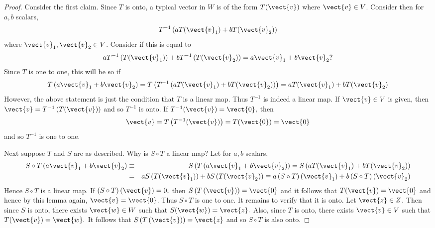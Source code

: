 \begin{proof}
Consider the first claim. Since $T$ is onto, a typical
vector in $W$ is of the form $T(\vect{v})$ where $\vect{v} \in V$. Consider then for $a,b$
scalars, 
\begin{equation*}
T^{-1}\left( aT(\vect{v}_{1})+bT(\vect{v}_{2})\right)
\end{equation*}
where $\vect{v}_{1}, \vect{v}_2 \in V$. Consider if this is equal to 
\begin{equation*}
aT^{-1}\left( T(\vect{v}_{1})\right) +bT^{-1}\left( T(\vect{v}_{2})\right) =a\vect{v}_{1}+b\vect{v}_{2}?
\end{equation*}
Since $T$ is one to one, this will be so if 
\begin{equation*}
T\left( a\vect{v}_{1}+b\vect{v}_{2}\right) =T\left( T^{-1}\left( aT(\vect{v}_{1})+bT(\vect{v}_{2})\right)
\right) =aT(\vect{v}_{1})+bT(\vect{v}_{2})
\end{equation*}
However, the above statement is just the condition that $T$ is a linear map.
Thus $T^{-1}$ is indeed a linear map. If $\vect{v} \in V$ is given, then $
\vect{v}=T^{-1}\left( T(\vect{v})\right) $ and so $T^{-1}$ is onto. If $T^{-1}(\vect{v})=\vect{0},$ then 
\begin{equation*}
\vect{v}=T\left( T^{-1}(\vect{v})\right) =T(\vect{0})=\vect{0}
\end{equation*}
and so  $T^{-1}$ is one to one.

Next suppose $T$ and $S$ are as described. Why is $S\circ T$ a linear map?
Let for $a,b$ scalars,
\begin{eqnarray*}
S\circ T\left( a\vect{v}_{1}+b\vect{v}_{2}\right) &\equiv &S\left( T\left(
a\vect{v}_{1}+b\vect{v}_{2}\right) \right) =S\left( aT(\vect{v}_{1})+bT(\vect{v}_{2})\right) \\
&=&aS\left( T(\vect{v}_{1})\right) +bS\left( T(\vect{v}_{2})\right) \equiv a\left( S\circ
T\right) \left( \vect{v}_{1}\right) +b\left( S\circ T\right) \left( \vect{v}_{2}\right)
\end{eqnarray*}
Hence $S\circ T$ is a linear map. If $\left( S\circ T\right) \left( \vect{v}\right)
=0,$ then $S\left( T\left( \vect{v} \right) \right) =\vect{0}$ and it follows that $T(\vect{v})=\vect{0}$ and hence by this lemma again, $\vect{v}=\vect{0}$. Thus $S\circ
T $ is one to one. It remains to verify that it is onto. Let $\vect{z}\in Z$. Then
since $S$ is onto, there exists $\vect{w}\in W$ such that $S(\vect{w})=\vect{z}.$ Also, since $T$
is onto, there exists $\vect{v}\in V$ such that $T(\vect{v})=\vect{w}.$ It follows that $S\left(
T\left( \vect{v}\right) \right) =\vect{z}$ and so $S\circ T$ is also onto.
\end{proof}

